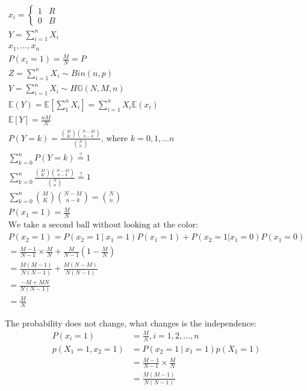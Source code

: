 \documentclass{article}
\begin{document}
\begin{gather*}
    x _{i} = \begin{cases}
        1 & R \\
        0 & B
    \end{cases}
    \\
    Y = \sum_{i=1}^{n} X _{i} \\
    x _{1}, \dots , x_n\\
    P(x _{i} = 1) = \frac{M}{N}  = P \\
    Z = \sum_{i=1}^{n} X _{i} \sim Bin(n,p)\\
    Y = \sum_{i=1}^{n} X _{i}  \sim H \mathbb{G}(N,M,n)\\
    \mathbb{E} (Y) = \mathbb{E} [\sum_{1}^{n} X _{i} ] = \sum_{i=1}^{n} X _{i} \mathbb{E} (x_i)\\
    \mathbb{E} [Y] = \frac{nM}{N} \\
    P(Y=k) = \frac{\binom{M}{K} \binom{N-M}{n-k}}{\binom{N}{n}} \text{, where } k = 0,1, \dots n\\
    \sum_{k=0}^{n} P(Y=k) \stackrel{?}{=} 1\\
    \sum_{k=0}^{n} \frac{\binom{M}{K} \binom{N-M}{n-k}}{\binom{N}{n}} \stackrel{?}{=} 1\\
    \sum_{k=0}^{n} \binom{M}{K} \binom{N-M}{n-k} = \binom{N}{n} \\
    P(x_1 = 1) = \frac{M}{N}\\
    \text{We take a second ball without looking at the color:}\\
    P(x_2 = 1) = P(x_2 = 1 \ \vert \ x_1=1)P(x_1 = 1) + P(x_2=1|x_1=0)P(x_1 = 0)\\
    = \frac{M-1}{N-1} \times \frac{M}{N} + \frac{M}{N-1}(1- \frac{M}{N} ) \\
    = \frac{M(M-1)}{N(N-1)} +  \frac{M(N-M)}{N(N-1)} \\
    = \frac{-M+MN}{N(N-1)} \\
    = \frac{M}{N}
\end{gather*}

The probability does not change, what changes is the independence:
\begin{align*}
    P(x _{i} = 1) & = \frac{M}{N}, i = 1,2, \dots ,n       \\
    p(X_1=1, x_2=1)
                  & = P(x_2=1 \ \vert \ x _{1} =1)p(X_1=1) \\
                  & = \frac{M-1}{N-1} \times \frac{M}{N}   \\
                  & = \frac{M(M-1)}{N(N-1)}
\end{align*}
\end{document}
